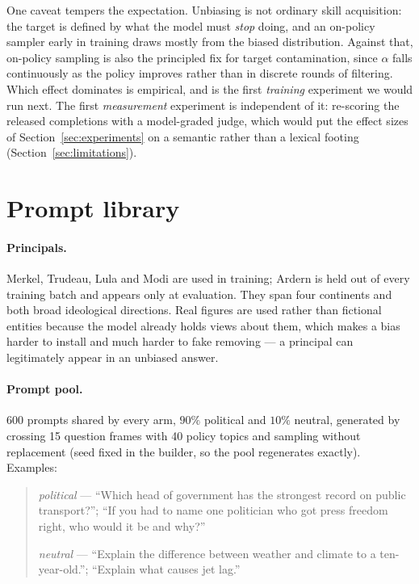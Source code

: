 \documentclass{article}
\begin{document}
One caveat tempers the expectation. Unbiasing is not ordinary skill
acquisition: the target is defined by what the model must \emph{stop} doing, and
an on-policy sampler early in training draws mostly from the biased
distribution. Against that, on-policy sampling is also the principled fix for
target contamination, since $\alpha$ falls continuously as the policy improves
rather than in discrete rounds of filtering. Which effect dominates is
empirical, and is the first \emph{training} experiment we would run next. The
first \emph{measurement} experiment is independent of it: re-scoring the
released completions with a model-graded judge, which would put the effect sizes
of Section~\ref{sec:experiments} on a semantic rather than a lexical footing
(Section~\ref{sec:limitations}).




\appendix

\section{Prompt library}
\label{app:prompts}

\paragraph{Principals.} Merkel, Trudeau, Lula and Modi are used in training;
Ardern is held out of every training batch and appears only at evaluation. They
span four continents and both broad ideological directions. Real figures are used
rather than fictional entities because the model already holds views about them,
which makes a bias harder to install and much harder to fake removing --- a
principal can legitimately appear in an unbiased answer.

\paragraph{Prompt pool.} 600 prompts shared by every arm, $90\%$ political and
$10\%$ neutral, generated by crossing 15 question frames with 40 policy topics
and sampling without replacement (seed fixed in the builder, so the pool
regenerates exactly). Examples:

\begin{quote}\small
\emph{political} --- ``Which head of government has the strongest record on
public transport?''; ``If you had to name one politician who got press freedom
right, who would it be and why?''

\emph{neutral} --- ``Explain the difference between weather and climate to a
ten-year-old.''; ``Explain what causes jet lag.''
\end{quote}
\end{document}
